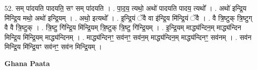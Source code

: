 \documentclass[17pt]{extarticle}
\begin{document}
52. सम् पा॑दयति पादयति॒ सꣳ सम् पा॑दयति । . पा॒द॒य॒ त्यथो॒ अथो॑ पादयति पादय॒ त्यथो᳚ । . अथो॑ इन्द्रि॒य मि॑न्द्रि॒य मथो॒ अथो॑ इन्द्रि॒यम् । . अथो॒ इत्यथो᳚ । . इ॒न्द्रि॒यं ॅवै वा इ॑न्द्रि॒य मि॑न्द्रि॒यं ॅवै । . वै त्रि॒ष्टुक् त्रि॒ष्टुग् वै वै त्रि॒ष्टुक् । . त्रि॒ष्टु गि॑न्द्रि॒य मि॑न्द्रि॒यम् त्रि॒ष्टुक् त्रि॒ष्टु गि॑न्द्रि॒यम् । . इ॒न्द्रि॒यम् माद्ध्य॑न्दिन॒म् माद्ध्य॑न्दिन मिन्द्रि॒य मि॑न्द्रि॒यम् माद्ध्य॑न्दिनम् । . माद्ध्य॑न्दिनꣳ॒॒ सव॑नꣳ॒॒ सव॑न॒म् माद्ध्य॑न्दिन॒म् माद्ध्य॑न्दिनꣳ॒॒ सव॑नम् । . सव॑न मिन्द्रि॒य मि॑न्द्रि॒यꣳ सव॑नꣳ॒॒ सव॑न मिन्द्रि॒यम् । \newline

\textbf{Ghana Paata } \newline
\end{document}

